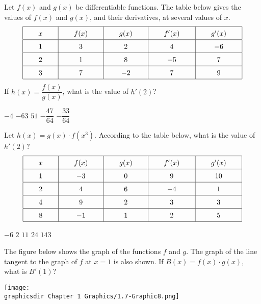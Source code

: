 \begin{questions}
    \question Let $f(x)$ and $g(x)$ be differentiable functions. The table below gives the values of $f(x)$ and $g(x)$, and their derivatives, at several values of $x$. \begin{align*}
        \arraycolsep=22pt\def\arraystretch{1.5} 
        \begin{array}{|c|c|c|c|c|}
            \hline
            x & f(x) & g(x) & f'(x) & g'(x) \\ \hline
            1 & 3 & 2 & 4 & -6 \\ \hline
            2 & 1 & 8 & -5 & 7 \\ \hline
            3 & 7 & -2 & 7 & 9 \\
            \hline
        \end{array}
    \end{align*}
    If $h(x) = \dfrac{f(x)}{g(x)}$, what is the value of $h'(2)$?

    \begin{oneparchoices}
        \choice $-4$
        \choice $-63$
        \choice $51$
        \choice $-\dfrac{47}{64}$
        \choice $-\dfrac{33}{64}$
    \end{oneparchoices} \par \horizontalline

    \question Let $h(x) = g(x) \cdot f\left(x^3\right)$. According to the table below, what is the value of $h'(2)$? \begin{align*}
        \arraycolsep=22pt\def\arraystretch{1.5} 
        \begin{array}{|c|c|c|c|c|}
            \hline
            x & f(x) & g(x) & f'(x) & g'(x) \\ \hline
            1 & -3 & 0 & 9 & 10 \\ \hline
            2 & 4 & 6 & -4 & 1 \\ \hline
            4 & 9 & 2 & 3 & 3 \\ \hline
            8 & -1 & 1 & 2 & 5 \\
            \hline
        \end{array}
    \end{align*}

    \begin{oneparchoices}
        \choice $-6$
        \choice $2$
        \choice $11$
        \choice $24$
        \choice $143$
    \end{oneparchoices} \par \horizontalline

    \question The figure below shows the graph of the functions $f$ and $g$. The graph of the line tangent to the graph of $f$ at $x = 1$ is also shown. If $B(x) = f(x) \cdot g(x)$, what is $B'(1)$? 
    \begin{center}
        \texttt{[image: \\graphicsdir Chapter 1 Graphics/1.7-Graphic8.png]}
    \end{center} \vspace{11pt}


\end{questions}

